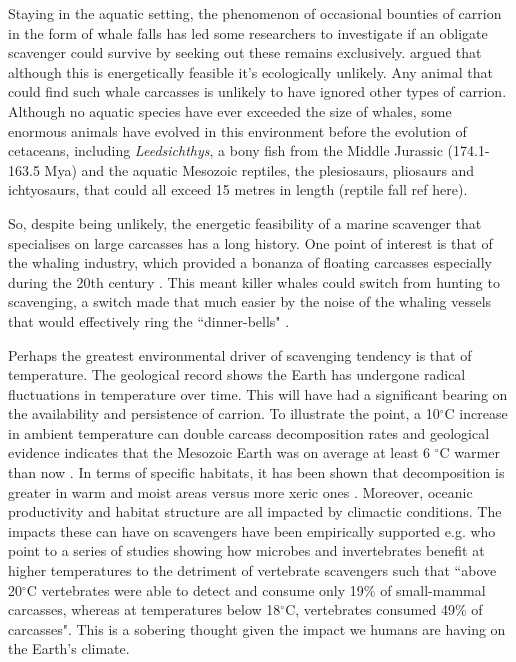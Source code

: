 \documentclass[a4paper,12pt]{article}
\begin{document}
Staying in the aquatic setting, the phenomenon of occasional bounties of carrion in the form of whale falls has led some researchers to investigate if an obligate scavenger could survive by seeking out these remains exclusively.
\cite{ruxton2005searching} argued that although this is energetically feasible it's ecologically unlikely.
Any animal that could find such whale carcasses is unlikely to have ignored other types of carrion.
Although no aquatic species have ever exceeded the size of whales, some enormous animals have evolved in this environment before the evolution of cetaceans, including \textit{Leedsichthys}, a bony fish from the Middle Jurassic (174.1-163.5 Mya) and the aquatic Mesozoic reptiles, the plesiosaurs, pliosaurs and ichtyosaurs, that could all exceed 15 metres in length \citep{ruxton2011zoology} (reptile fall ref here).

So, despite being unlikely, the energetic feasibility of a marine scavenger that specialises on large carcasses has a long history.
One point of interest is that of the whaling industry, which provided a bonanza of floating carcasses especially during the 20th century \citep{Whitehead415}.
This meant killer whales could switch from hunting to scavenging, a switch made that much easier by the noise of the whaling vessels that would effectively ring the ``dinner-bells" \citep{Whitehead415}.


Perhaps the greatest environmental driver of scavenging tendency is that of temperature. 
The geological record shows the Earth has undergone radical fluctuations in temperature over time.
This will have had a significant bearing on the availability and persistence of carrion.
To illustrate the point, a 10$^{\circ}$C increase in ambient temperature can double carcass decomposition rates \citep{parmenter2009carrion} and geological evidence indicates that the Mesozoic Earth was on average at least 6 $^{\circ}$C warmer than now \citep{sellwood2006mesozoic}.
In terms of specific habitats, it has been shown that decomposition is greater in warm and moist areas versus more xeric ones \citep{beasley2015vertebrates}.
Moreover, oceanic productivity and habitat structure are all impacted by climactic conditions.
The impacts these can have on scavengers have been empirically supported e.g. \cite{beasley2015vertebrates} who point to a series of studies showing how microbes and invertebrates benefit at higher temperatures to the detriment of vertebrate scavengers such that ``above 20$^{\circ}$C vertebrates were able to detect and consume only 19\% of small-mammal carcasses, whereas at temperatures below 18$^{\circ}$C, vertebrates consumed 49\% of carcasses".
This is a sobering thought given the impact we humans are having on the Earth's climate. 
\end{document}
